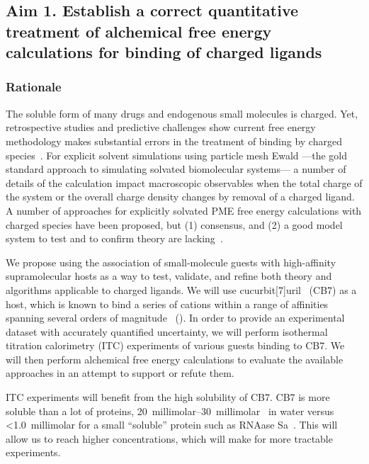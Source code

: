 \documentclass[10pt,final]{article}
\begin{document}
\subsection*{Aim 1. Establish a correct quantitative treatment of alchemical free energy calculations for binding of charged ligands}
\subsubsection*{Rationale}
The soluble form of many drugs and endogenous small molecules is charged. Yet, retrospective studies and predictive challenges show current free energy methodology makes substantial errors in the treatment of binding by charged species~\autocite{Rocklin2013b,Muddana2014a}.
%
For explicit solvent simulations using particle mesh Ewald ---the gold standard approach to simulating solvated biomolecular systems--- a number of details of the calculation impact macroscopic observables when the total charge of the system or the overall charge density changes by removal of a charged ligand.
%
A number of approaches for explicitly solvated PME free energy calculations with charged species have been proposed, but (1) consensus, and (2) a good model system to test and to confirm theory are lacking~\autocite{Reif2013a, Rocklin2013a, Lin2014a}.

We propose using the association of small-molecule guests with high-affinity supramolecular hosts as a way to test, validate, and refine both theory and algorithms applicable to charged ligands.
%
We will use cucurbit[7]uril~\autocite{Lagona2005a} (CB7) as a host, which is known to bind a series of cations within a range of affinities spanning several orders of magnitude~\autocite{Cao2013a} ().
%
In order to provide an experimental dataset with accurately quantified uncertainty, we will perform isothermal titration calorimetry (ITC) experiments of various guests binding to CB7.
%
We will then perform alchemical free energy calculations to evaluate the available approaches in an attempt to support or refute them.

%
ITC experiments will benefit from the high solubility of CB7.
%
CB7 is more soluble than a lot of proteins, \SIrange[scientific-notation=false]{20}{30}{millimolar}~\autocite{Lagona2005a} in water versus \textless \SI{1.0}{millimolar} for a small ``soluble'' protein such as RNAase Sa~\autocite{Pace2004a}.
%
This will allow us to reach higher concentrations, which will make for more tractable experiments.
\end{document}
